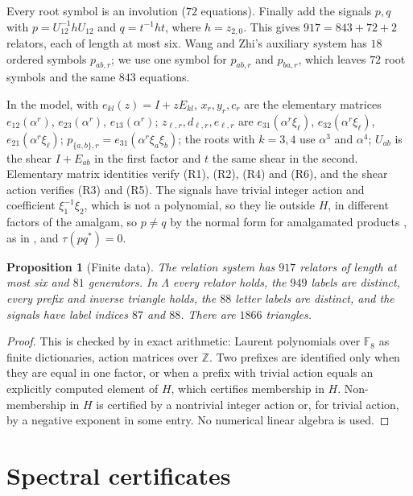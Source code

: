 \documentclass[11pt]{article}
\newtheorem{proposition}[theorem]{Proposition}
\begin{document}
Every root symbol is an involution ($72$ equations).  Finally add the signals $p,q$ with $p=U_{12}^{-1}hU_{12}$ and $q=t^{-1}ht$, where $h=z_{2,0}$.  This gives $917=843+72+2$ relators, each of length at most six.  Wang and Zhi's auxiliary system has $18$ ordered symbols $p_{ab,r}$; we use one symbol for $p_{ab,r}$ and $p_{ba,r}$, which leaves $72$ root symbols and the same $843$ equations.

In the model, with $e_{kl}(z)=I+zE_{kl}$, $x_r,y_r,c_r$ are the elementary matrices $e_{12}(\alpha^r)$, $e_{23}(\alpha^r)$, $e_{13}(\alpha^r)$; $z_{\ell,r},d_{\ell,r},e_{\ell,r}$ are $e_{31}(\alpha^r\xi_\ell)$, $e_{32}(\alpha^r\xi_\ell)$, $e_{21}(\alpha^r\xi_\ell)$; $p_{\{a,b\},r}=e_{31}(\alpha^r\xi_a\xi_b)$; the roots with $k=3,4$ use $\alpha^3$ and $\alpha^4$; $U_{ab}$ is the shear $I+E_{ab}$ in the first factor and $t$ the same shear in the second.  Elementary matrix identities verify (R1), (R2), (R4) and (R6), and the shear action verifies (R3) and (R5).  The signals have trivial integer action and coefficient $\xi_1^{-1}\xi_2$, which is not a polynomial, so they lie outside $H$, in different factors of the amalgam, so $p\ne q$ by the normal form for amalgamated products \cite{Serre80}, as in \cite[(2.9) and Lemma~2.2]{WangZhi26}, and $\tau(pq^*)=0$.

\begin{proposition}[Finite data]\label{prop:finite-system}
The relation system has $917$ relators of length at most six and $81$ generators.  In $\Lambda$ every relator holds, the $949$ labels are distinct, every prefix and inverse triangle holds, the $88$ letter labels are distinct, and the signals have label indices $87$ and $88$.  There are $1866$ triangles.
\end{proposition}
\begin{proof}
This is checked by  in exact arithmetic: Laurent polynomials over $\mathbb F_8$ as finite dictionaries, action matrices over $\mathbb Z$.  Two prefixes are identified only when they are equal in one factor, or when a prefix with trivial action equals an explicitly computed element of $H$, which certifies membership in $H$.  Non-membership in $H$ is certified by a nontrivial integer action or, for trivial action, by a negative exponent in some entry.  No numerical linear algebra is used.
\end{proof}

\section{Spectral certificates}\label{sec:spectral}
\end{document}
